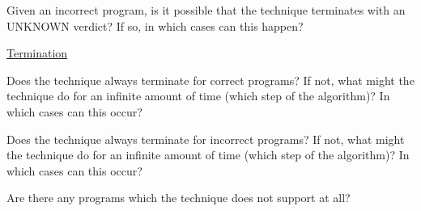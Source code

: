 \documentclass[a4paper]{article}
\begin{document}
\begin{landscape}
\begin{minipage}[t]{0.2\linewidth}
\begin{betterlist}
\begin{betterlist}
\begin{betterlist}
				\item Given an incorrect program, is it possible that the technique terminates with an UNKNOWN verdict? If so, in which cases can this happen?

			\end{betterlist}
			\item \underline{Termination}
			\begin{betterlist}
				\item Does the technique always terminate for correct programs? If not, what might the technique do for an infinite amount of time (which step of the algorithm)? In which cases can this occur?

				\item Does the technique always terminate for incorrect programs? If not, what might the technique do for an infinite amount of time (which step of the algorithm)? In which cases can this occur?

			\end{betterlist}
			\item Are there any programs which the technique does not support at all?


\end{betterlist}
\end{betterlist}
\end{minipage}
\end{landscape}
\end{document}
